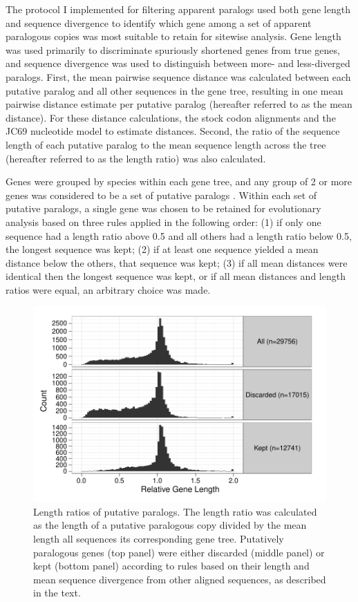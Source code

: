 The protocol I implemented for filtering apparent paralogs used both
gene length and sequence divergence to identify which gene among a set
of apparent paralogous copies was most suitable to retain for sitewise
analysis. Gene length was used primarily to discriminate spuriously
shortened genes from true genes, and sequence divergence was used to
distinguish between more- and less-diverged paralogs. First, the mean
pairwise sequence distance was calculated between each putative
paralog and all other sequences in the gene tree, resulting in one
mean pairwise distance estimate per putative paralog (hereafter
referred to as the mean distance). For these distance calculations,
the stock \cmp codon alignments and the JC69 nucleotide model to
estimate distances. Second, the ratio of the sequence length of each
putative paralog to the mean sequence length across the tree
(hereafter referred to as the length ratio) was also calculated.

Genes were grouped by species within each gene tree, and any group of
2 or more genes was considered to be a set of putative paralogs
. Within each set of putative paralogs, a single gene was chosen to be
retained for evolutionary analysis based on three rules applied in the
following order: (1) if only one sequence had a length ratio above 0.5
and all others had a length ratio below 0.5, the longest sequence was
kept; (2) if at least one sequence yielded a mean distance below the
others, that sequence was kept; (3) if all mean distances were
identical then the longest sequence was kept, or if all mean distances
and length ratios were equal, an arbitrary choice was made.

\begin{figure}
\centering
\includegraphics[scale=0.7]{Figs/filtered_paralogs_hist.pdf}
\caption{Length ratios of putative paralogs. The length ratio was
  calculated as the length of a putative paralogous copy divided by
  the mean length all sequences its corresponding gene
  tree. Putatively paralogous genes (top panel) were either discarded
  (middle panel) or kept (bottom panel) according to rules based on
  their length and mean sequence divergence from other aligned
  sequences, as described in the text.}
\label{filtered_paralogs_hist}
\end{figure}

